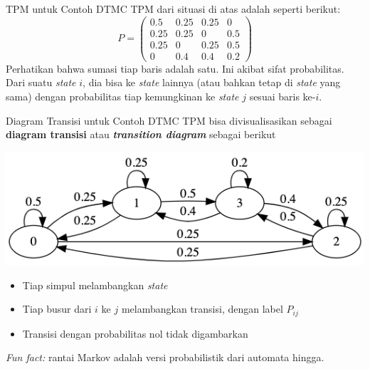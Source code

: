 \documentclass{beamer}
\begin{document}
\begin{frame}{TPM untuk Contoh DTMC}
    TPM dari situasi di atas adalah seperti berikut:
    \[ P = \begin{pmatrix}
        0.5 & 0.25 & 0.25 & 0 \\
        0.25 & 0.25 & 0 & 0.5 \\
        0.25 & 0 & 0.25 & 0.5 \\
        0 & 0.4 & 0.4 & 0.2
    \end{pmatrix} \]
    Perhatikan bahwa sumasi tiap baris adalah satu. Ini akibat sifat probabilitas. Dari suatu \textit{state} \(i\), dia bisa ke \textit{state} lainnya (atau bahkan tetap di \textit{state} yang sama) dengan probabilitas tiap kemungkinan ke \textit{state} \(j\) sesuai baris ke-\(i\).
\end{frame}

\begin{frame}{Diagram Transisi untuk Contoh DTMC}
    TPM bisa divisualisasikan sebagai \textbf{diagram transisi} atau \textbf{\textit{transition diagram}} sebagai berikut

    \includegraphics[scale=0.5]{gambar/contoh_dtmc.png}

    \begin{itemize}
        \item Tiap simpul melambangkan \textit{state}
        \item Tiap busur dari \(i\) ke \(j\) melambangkan transisi, dengan label \(P_{ij}\)
        \item Transisi dengan probabilitas nol tidak digambarkan
    \end{itemize}
    \textit{Fun fact:} rantai Markov adalah versi probabilistik dari automata hingga.
\end{frame}
\end{document}
